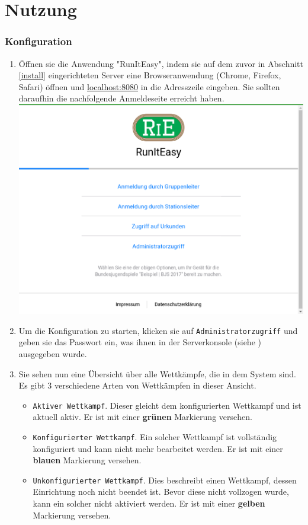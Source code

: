 \documentclass[11pt,a4paper,titlepage,german]{article}
\begin{document}
	\newpage
		
	\part{Nutzung}
		\section{Konfiguration}
			\begin{enumerate}
				\item Öffnen sie die Anwendung "RunItEasy", indem sie auf dem zuvor in Abschnitt \ref{install} eingerichteten Server eine Browseranwendung (Chrome, Firefox, Safari) öffnen und \href{http://localhost:8080/}{\underline{\color{blue}localhost:8080}} in die Adresszeile eingeben. Sie sollten daraufhin die nachfolgende Anmeldeseite erreicht haben.\\
				\includegraphics[width=\textwidth]{Login}
				
				\item Um die Konfiguration zu starten, klicken sie auf \texttt{Administratorzugriff} und geben sie das Passwort ein, was ihnen in der Serverkonsole (siehe ) ausgegeben wurde.
				
				\item {}
					Sie sehen nun eine Übersicht über alle Wettkämpfe, die in dem System sind. Es gibt 3 verschiedene Arten von Wettkämpfen in dieser Ansicht.
					\begin{itemize}
						\item \texttt{Aktiver Wettkampf}. Dieser gleicht dem konfigurierten Wettkampf und ist aktuell aktiv. Er ist mit einer \textbf{\color{CGreen}grünen} Markierung versehen.
						\item \texttt{Konfigurierter Wettkampf}. Ein solcher Wettkampf ist vollständig konfiguriert und kann nicht mehr bearbeitet werden. Er ist mit einer \textbf{\color{CBlue}blauen} Markierung versehen.
						\item \texttt{Unkonfigurierter Wettkampf}. Dies beschreibt einen Wettkampf, dessen Einrichtung noch nicht beendet ist. Bevor diese nicht vollzogen wurde, kann ein solcher nicht aktiviert werden. Er ist mit einer \textbf{\color{CYellow}gelben} Markierung versehen.
					\end{itemize}
				

\end{enumerate}
\end{document}
